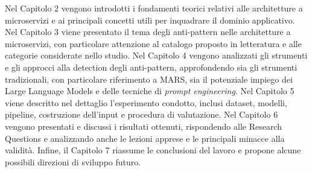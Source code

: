 Nel Capitolo 2 vengono introdotti i fondamenti teorici relativi alle architetture a microservizi e ai principali concetti utili per inquadrare il dominio applicativo. Nel Capitolo 3 viene presentato il tema degli anti-pattern nelle architetture a microservizi, con particolare attenzione al catalogo proposto in letteratura e alle categorie considerate nello studio. Nel Capitolo 4 vengono analizzati gli strumenti e gli approcci alla detection degli anti-pattern, approfondendo sia gli strumenti tradizionali, con particolare riferimento a MARS, sia il potenziale impiego dei Large Language Models e delle tecniche di \textit{prompt engineering}. Nel Capitolo 5 viene descritto nel dettaglio l’esperimento condotto, inclusi dataset, modelli, pipeline, costruzione dell’input e procedura di valutazione. Nel Capitolo 6 vengono presentati e discussi i risultati ottenuti, rispondendo alle Research Questions e analizzando anche le lezioni apprese e le principali minacce alla validità. Infine, il Capitolo 7 riassume le conclusioni del lavoro e propone alcune possibili direzioni di sviluppo futuro.



